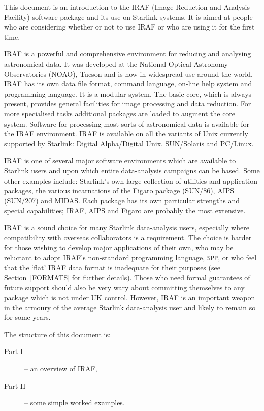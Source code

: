\documentclass[twoside,11pt]{article}
\newcommand{\xref}[3]{#1}
\begin{document}
This document is an introduction to the IRAF (Image Reduction and
Analysis Facility) software package and its use on Starlink systems.
It is aimed at people who are considering whether or not to use IRAF or
who are using it for the first time.

IRAF is a powerful and comprehensive environment for reducing and
analysing astronomical data.  It was developed at the National Optical
Astronomy Observatories (NOAO), Tucson and is now in widespread use around
the world.  IRAF has its own data file format, command language, on-line
help system and programming language.  It is a modular system.  The basic
core, which is always present, provides general facilities for image
processing and data reduction.  For more specialised tasks additional
packages are loaded to augment the core system.  Software for processing
most sorts of astronomical data is available for the IRAF environment.
IRAF is available on all the variants of Unix currently supported by
Starlink: Digital Alpha/Digital Unix, SUN/Solaris and PC/Linux.

IRAF is one of several major software environments which are available
to Starlink users and upon which entire data-analysis campaigns can be
based.   Some other examples include: Starlink's own large collection of
utilities and application packages, the various incarnations of
the Figaro package (\xref{SUN/86}{sun86}{}\cite{SUN86}), AIPS
(\xref{SUN/207}{sun207}{}\cite{SUN207}) and MIDAS.  Each package has its
own particular strengths and special capabilities;  IRAF, AIPS and
Figaro are probably the most extensive.

IRAF is a sound choice for many Starlink data-analysis users,
especially where compatibility with overseas collaborators is a
requirement.  The choice is harder for those wishing to develop major
applications of their own, who may be reluctant to adopt IRAF's
non-standard programming language, {\tt SPP}, or who feel that the
`flat' IRAF data format is inadequate for their purposes (see
Section~\ref{FORMATS} for further details).  Those who need formal
guarantees of future support should also be very wary about committing
themselves to any package which is not under UK control.  However, IRAF
is an important weapon in the armoury of the average Starlink
data-analysis user and likely to remain so for some years.

The structure of this document is:

\begin{description}

  \item[{\rm Part I}] -- an overview of IRAF,

  \item[{\rm Part II}] -- some simple worked examples.

\end{description}
\end{document}
